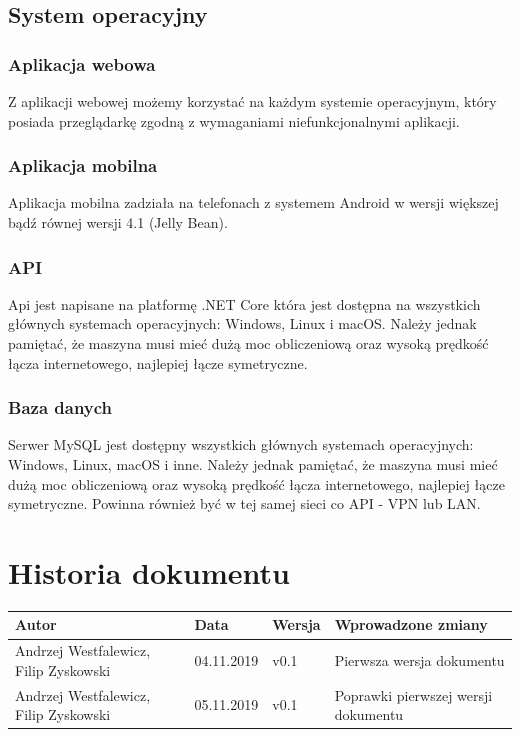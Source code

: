 \documentclass{article}
\begin{document}
\subsection{System operacyjny}
\subsubsection{Aplikacja webowa}
Z aplikacji webowej możemy korzystać na każdym systemie operacyjnym, który posiada przeglądarkę zgodną z wymaganiami niefunkcjonalnymi aplikacji. 
\subsubsection{Aplikacja mobilna}
Aplikacja mobilna zadziała na telefonach z systemem Android w wersji większej bądź równej wersji 4.1 (Jelly Bean).
\subsubsection{API}
Api jest napisane na platformę .NET Core która jest dostępna na wszystkich głównych systemach operacyjnych: Windows, Linux i macOS.\cite{dotnetcore} Należy jednak pamiętać, że maszyna musi mieć dużą moc obliczeniową oraz wysoką prędkość łącza internetowego, najlepiej łącze symetryczne.
\subsubsection{Baza danych}
Serwer MySQL jest dostępny wszystkich głównych systemach operacyjnych: Windows, Linux, macOS i inne.\cite{mysqlwiki} Należy jednak pamiętać, że maszyna musi mieć dużą moc obliczeniową oraz wysoką prędkość łącza internetowego, najlepiej łącze symetryczne. Powinna również być w tej samej sieci co API - VPN lub LAN.
\section{Historia dokumentu}

\begin{tabularx}{\linewidth}{|X|l|l|X|}
    \hline
    Autor & Data & Wersja & Wprowadzone zmiany \\
    \hline
    Andrzej Westfalewicz, Filip Zyskowski & 04.11.2019 & v0.1 & Pierwsza wersja dokumentu \\
    \hline
    Andrzej Westfalewicz, Filip Zyskowski & 05.11.2019 & v0.1 & Poprawki pierwszej wersji dokumentu \\
    \hline
\end{tabularx}
\end{document}
